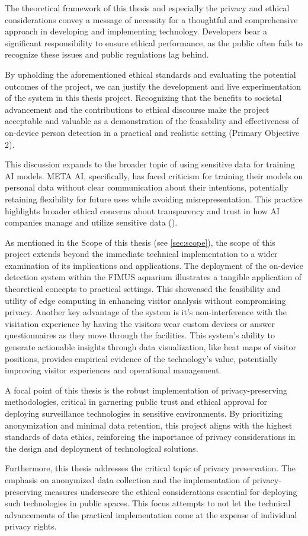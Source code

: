 The theoretical framework of this thesis and especially the privacy and ethical considerations convey a message of necessity for a thoughtful and comprehensive approach in developing and implementing technology. Developers bear a significant responsibility to ensure ethical performance, as the public often fails to recognize these issues and public regulations lag behind.

By upholding the aforementioned ethical standards and evaluating the potential outcomes of the project, we can justify the development and live experimentation of the system in this thesis project. Recognizing that the benefits to societal advancement and the contributions to ethical discourse make the project acceptable and valuable as a demonstration of the feasability and effectiveness of on-device person detection in a practical and realistic setting (Primary Objective 2). 

This discussion expands to the broader topic of using sensitive data for training AI models. META AI, specifically, has faced criticism for training their models on personal data without clear communication about their intentions, potentially retaining flexibility for future uses while avoiding misrepresentation. This practice highlights broader ethical concerns about transparency and trust in how AI companies manage and utilize sensitive data (\cite{ing2024metapersonvern}).

As mentioned in the Scope of this thesis (see \ref{sec:scope}), the scope of this project extends beyond the immediate technical implementation to a wider examination of its implications and applications. The deployment of the on-device detection system within the FIMUS aquarium illustrates a tangible application of theoretical concepts to practical settings. This showcased the feasibility and utility of edge computing in enhancing visitor analysis without compromising privacy. Another key advantage of the system is it's non-interference with the visitation experience by having the visitors wear custom devices or answer questionnaires as they move through the facilities. This system's ability to generate actionable insights through data visualization, like heat maps of visitor positions, provides empirical evidence of the technology's value, potentially improving visitor experiences and operational management.

A focal point of this thesis is the robust implementation of privacy-preserving methodologies, critical in garnering public trust and ethical approval for deploying surveillance technologies in sensitive environments. By prioritizing anonymization and minimal data retention, this project aligns with the highest standards of data ethics, reinforcing the importance of privacy considerations in the design and deployment of technological solutions.

Furthermore, this thesis addresses the critical topic of privacy preservation. The emphasis on anonymized data collection and the implementation of privacy-preserving measures underscore the ethical considerations essential for deploying such technologies in public spaces. This focus attempts to not let the technical advancements of the practical implementation come at the expense of individual privacy rights.